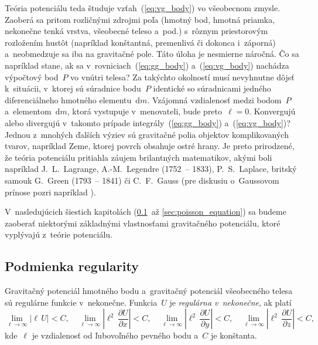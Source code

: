 \documentclass[a4paper, 12pt]{book}
\newcommand{\diff}{\mathrm d}
\begin{document}
Teória potenciálu teda študuje vzťah~(\ref{eq:vg_body}) vo všeobecnom zmysle.  
Zaoberá sa pritom rozličnými zdrojmi poľa (hmotný bod, hmotná priamka, 
nekonečne tenká vrstva, všeobecné teleso a~pod.) s~rôznym priestorovým 
rozložením hustôt (napríklad konštantná, premenlivá či dokonca i~záporná) 
a~neobmedzuje sa iba na gravitačné pole.  Táto úloha je nesmierne náročná.  Čo 
sa napríklad stane, ak sa v~rovniciach~(\ref{eq:gg_body}) a~(\ref{eq:vg_body}) 
nachádza výpočtový bod~$P$ vo vnútri telesa?  Za takýchto okolností musí 
nevyhnutne dôjsť k~situácii, v~ktorej sú súradnice bodu~$P$ identické so 
súradnicami jedného diferenciálneho hmotného elementu~$\diff m$.  Vzájomná 
vzdialenosť medzi bodom~$P$ a~elementom~$\diff m$, ktorá vystupuje 
v~menovateli, bude preto~$\ell = 0$.  Konvergujú alebo divergujú v~takomto 
prípade integrály~(\ref{eq:gg_body}) a~(\ref{eq:vg_body})?  Jednou z~mnohých 
ďalších výziev sú gravitačné polia objektov komplikovaných tvarov, napríklad 
Zeme, ktorej povrch obsahuje ostré hrany.  Je preto prirodzené, že teória 
potenciálu pritiahla záujem brilantných matematikov, akými boli napríklad 
J.~L.~Lagrange, A.-M.~Legendre (1752~-- 1833), P.~S.~Laplace, britský samouk 
G.~Green (1793~-- 1841) či C.~F.~Gauss (pre diskusiu o~Gaussovom prínose pozri 
napríklad \cite{Freeden2018}).

V~nasledujúcich šiestich kapitolách (\ref{sec:regular_function}~až 
\ref{sec:poisson_equation}) sa budeme zaoberať niektorými základnými
vlastnosťami gravitačného potenciálu, ktoré vyplývajú z~teórie potenciálu.






\subsection{Podmienka regularity}
\label{sec:regular_function}

Gravitačný potenciál hmotného bodu a~gravitačný potenciál všeobecného telesa sú 
regulárne funkcie v~nekonečne.  Funkcia~$U$ je \emph{regulárna v~nekonečne}, ak 
platí \parencite{Kellogg1967,Pick1973}
%
\begin{equation}
\label{eq:regular_function}
\lim_{\ell \rightarrow \infty}\left| \ell \, U \right| < C{,} \quad \lim_{\ell 
\rightarrow \infty}\left| \ell^2 \, \frac{\partial U}{\partial x} \right| 
< C{,} \quad \lim_{\ell \rightarrow \infty}\left| \ell^2 \, \frac{\partial 
U}{\partial y} \right| < C{,} \quad \lim_{\ell \rightarrow \infty}\left| \ell^2 
\, \frac{\partial U}{\partial z} \right| < C{,}
\end{equation}
%
kde~$\ell$ je vzdialenosť od ľubovoľného pevného bodu a~$C$ je konštanta.
\end{document}
